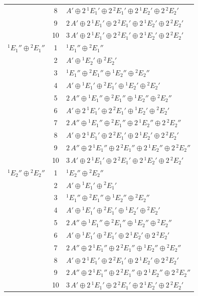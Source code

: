 \documentclass[11pt]{article}
\begin{document}
\begin{longtable}{l c p{}}
 & 8 & $A'\oplus 2\,{}^{1}E_{1}'\oplus 2\,{}^{2}E_{1}'\oplus 2\,{}^{1}E_{2}'\oplus 2\,{}^{2}E_{2}'$\\
 & 9 & $2\,A'\oplus 2\,{}^{1}E_{1}'\oplus 2\,{}^{2}E_{1}'\oplus 2\,{}^{1}E_{2}'\oplus 2\,{}^{2}E_{2}'$\\
 & 10 & $3\,A'\oplus 2\,{}^{1}E_{1}'\oplus 2\,{}^{2}E_{1}'\oplus 2\,{}^{1}E_{2}'\oplus 2\,{}^{2}E_{2}'$\\
\hline
${}^{1}E_{1}''\oplus {}^{2}E_{1}''$ & 1 & ${}^{1}E_{1}''\oplus {}^{2}E_{1}''$\\
 & 2 & $A'\oplus {}^{1}E_{2}'\oplus {}^{2}E_{2}'$\\
 & 3 & ${}^{1}E_{1}''\oplus {}^{2}E_{1}''\oplus {}^{1}E_{2}''\oplus {}^{2}E_{2}''$\\
 & 4 & $A'\oplus {}^{1}E_{1}'\oplus {}^{2}E_{1}'\oplus {}^{1}E_{2}'\oplus {}^{2}E_{2}'$\\
 & 5 & $2\,A''\oplus {}^{1}E_{1}''\oplus {}^{2}E_{1}''\oplus {}^{1}E_{2}''\oplus {}^{2}E_{2}''$\\
 & 6 & $A'\oplus 2\,{}^{1}E_{1}'\oplus 2\,{}^{2}E_{1}'\oplus {}^{1}E_{2}'\oplus {}^{2}E_{2}'$\\
 & 7 & $2\,A''\oplus {}^{1}E_{1}''\oplus {}^{2}E_{1}''\oplus 2\,{}^{1}E_{2}''\oplus 2\,{}^{2}E_{2}''$\\
 & 8 & $A'\oplus 2\,{}^{1}E_{1}'\oplus 2\,{}^{2}E_{1}'\oplus 2\,{}^{1}E_{2}'\oplus 2\,{}^{2}E_{2}'$\\
 & 9 & $2\,A''\oplus 2\,{}^{1}E_{1}''\oplus 2\,{}^{2}E_{1}''\oplus 2\,{}^{1}E_{2}''\oplus 2\,{}^{2}E_{2}''$\\
 & 10 & $3\,A'\oplus 2\,{}^{1}E_{1}'\oplus 2\,{}^{2}E_{1}'\oplus 2\,{}^{1}E_{2}'\oplus 2\,{}^{2}E_{2}'$\\
\hline
${}^{1}E_{2}''\oplus {}^{2}E_{2}''$ & 1 & ${}^{1}E_{2}''\oplus {}^{2}E_{2}''$\\
 & 2 & $A'\oplus {}^{1}E_{1}'\oplus {}^{2}E_{1}'$\\
 & 3 & ${}^{1}E_{1}''\oplus {}^{2}E_{1}''\oplus {}^{1}E_{2}''\oplus {}^{2}E_{2}''$\\
 & 4 & $A'\oplus {}^{1}E_{1}'\oplus {}^{2}E_{1}'\oplus {}^{1}E_{2}'\oplus {}^{2}E_{2}'$\\
 & 5 & $2\,A''\oplus {}^{1}E_{1}''\oplus {}^{2}E_{1}''\oplus {}^{1}E_{2}''\oplus {}^{2}E_{2}''$\\
 & 6 & $A'\oplus {}^{1}E_{1}'\oplus {}^{2}E_{1}'\oplus 2\,{}^{1}E_{2}'\oplus 2\,{}^{2}E_{2}'$\\
 & 7 & $2\,A''\oplus 2\,{}^{1}E_{1}''\oplus 2\,{}^{2}E_{1}''\oplus {}^{1}E_{2}''\oplus {}^{2}E_{2}''$\\
 & 8 & $A'\oplus 2\,{}^{1}E_{1}'\oplus 2\,{}^{2}E_{1}'\oplus 2\,{}^{1}E_{2}'\oplus 2\,{}^{2}E_{2}'$\\
 & 9 & $2\,A''\oplus 2\,{}^{1}E_{1}''\oplus 2\,{}^{2}E_{1}''\oplus 2\,{}^{1}E_{2}''\oplus 2\,{}^{2}E_{2}''$\\
 & 10 & $3\,A'\oplus 2\,{}^{1}E_{1}'\oplus 2\,{}^{2}E_{1}'\oplus 2\,{}^{1}E_{2}'\oplus 2\,{}^{2}E_{2}'$\\
\hline
\end{longtable}
\end{document}
